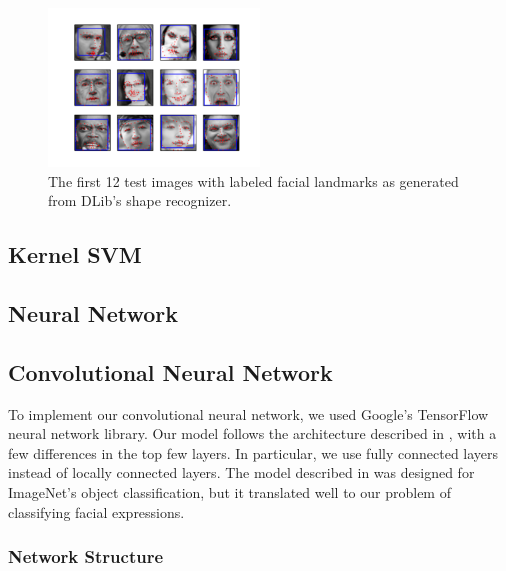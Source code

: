 \documentclass[11pt, twocolumn, twoside]{article}
\begin{document}
\begin{figure}
\centering
\includegraphics[width=0.5\textwidth]{landmarks}
\caption{\label{fig:landmarks} The first 12 test images with labeled facial landmarks
as generated from DLib's shape recognizer.}
\end{figure}

\subsection{Kernel SVM}

\subsection{Neural Network}

\subsection{Convolutional Neural Network}

To implement our convolutional neural network, we used Google's TensorFlow neural network library.
Our model follows the architecture described in \cite{Krizhevsky}, with a few differences in the top few layers.
In particular, we use fully connected layers instead of locally connected layers. The model described in
\cite{Krizhevsky} was designed for ImageNet's object classification, but it translated well to our problem of classifying facial expressions.

\subsubsection{Network Structure}
\end{document}
